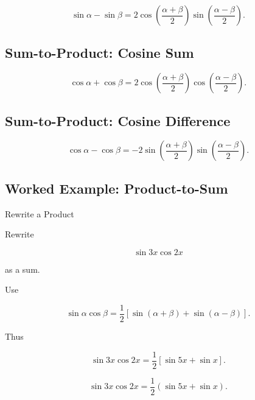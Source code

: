 \[
\boxed{
\sin\alpha-\sin\beta
=
2
\cos
\left(
\frac{\alpha+\beta}{2}
\right)
\sin
\left(
\frac{\alpha-\beta}{2}
\right).
}
\]

\subsection{Sum-to-Product: Cosine Sum}
\label{subsec:sum-to-product-cosine-sum}

\[
\boxed{
\cos\alpha+\cos\beta
=
2
\cos
\left(
\frac{\alpha+\beta}{2}
\right)
\cos
\left(
\frac{\alpha-\beta}{2}
\right).
}
\]

\subsection{Sum-to-Product: Cosine Difference}
\label{subsec:sum-to-product-cosine-difference}

\[
\boxed{
\cos\alpha-\cos\beta
=
-2
\sin
\left(
\frac{\alpha+\beta}{2}
\right)
\sin
\left(
\frac{\alpha-\beta}{2}
\right).
}
\]

\subsection{Worked Example: Product-to-Sum}
\label{subsec:worked-product-to-sum}

\begin{workedexamplebox}{Rewrite a Product}

Rewrite

\[
\sin3x\cos2x
\]

as a sum.

Use

\[
\sin\alpha\cos\beta
=
\frac12
\left[
\sin(\alpha+\beta)
+
\sin(\alpha-\beta)
\right].
\]

Thus

\[
\sin3x\cos2x
=
\frac12
\left[
\sin5x+\sin x
\right].
\]

\begin{answerbox}
\[
\boxed{
\sin3x\cos2x
=
\frac12
(\sin5x+\sin x).
}
\]
\end{answerbox}

\end{workedexamplebox}


